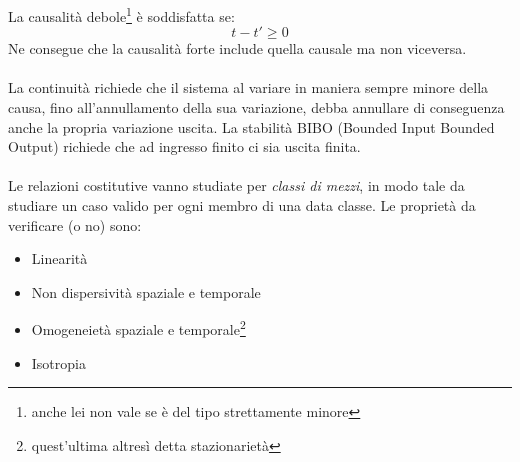 \documentclass{book}
\begin{document}
            La causalità debole\footnote{anche lei non vale se è del tipo strettamente minore} è soddisfatta se:
            \begin{equation}
                t-t' \geq 0
            \end{equation}
            Ne consegue che la causalità forte include quella causale ma non viceversa. \\ \\
            La continuità richiede che il sistema al variare in maniera sempre minore della causa, fino all'annullamento della sua variazione, debba annullare di conseguenza anche la propria variazione uscita.
            La stabilità BIBO (Bounded Input Bounded Output) richiede che ad ingresso finito ci sia uscita finita. \\ \\
            Le relazioni costitutive vanno studiate per \textit{classi di mezzi}, in modo tale da studiare un caso valido per ogni membro di una data classe. Le proprietà da verificare (o no) sono:
            \begin{itemize}
                \item Linearità
                \item Non dispersività spaziale e temporale
                \item Omogeneietà spaziale e temporale\footnote{quest'ultima altresì detta stazionarietà}
                \item Isotropia
            \end{itemize}
\end{document}
